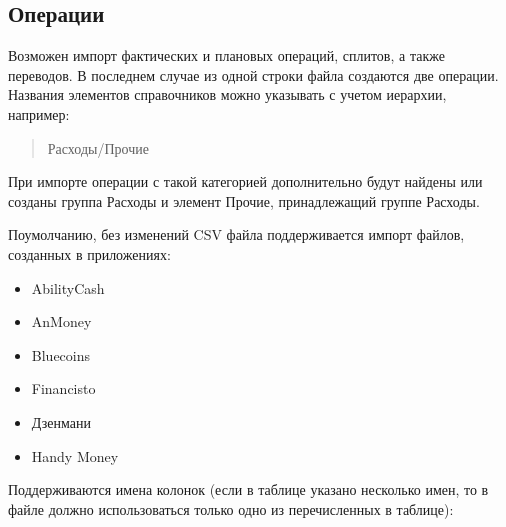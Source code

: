 \documentclass[a4paper,10pt,russian]{sphinxmanual}
\begin{document}
\subsection{Операции}
\label{\detokenize{import:id5}}
\sphinxAtStartPar
Возможен импорт фактических и плановых операций, сплитов, а также переводов. В последнем случае из одной
строки файла создаются две операции. Названия элементов справочников можно указывать с учетом иерархии, например:
\begin{quote}

\sphinxAtStartPar
Расходы/Прочие
\end{quote}

\sphinxAtStartPar
При импорте операции с такой категорией дополнительно будут найдены или созданы группа Расходы и элемент Прочие,
принадлежащий группе Расходы.

\sphinxAtStartPar
По\sphinxhyphen{}умолчанию, без изменений CSV файла поддерживается импорт файлов, созданных в приложениях:
\begin{itemize}
\item {} 
\sphinxAtStartPar
AbilityCash

\item {} 
\sphinxAtStartPar
AnMoney

\item {} 
\sphinxAtStartPar
Bluecoins

\item {} 
\sphinxAtStartPar
Financisto

\item {} 
\sphinxAtStartPar
Дзен\sphinxhyphen{}мани

\item {} 
\sphinxAtStartPar
Handy Money

\end{itemize}

\sphinxAtStartPar
Поддерживаются имена колонок (если в таблице указано несколько имен, то в файле должно
использоваться только одно из перечисленных в таблице):
\end{document}
